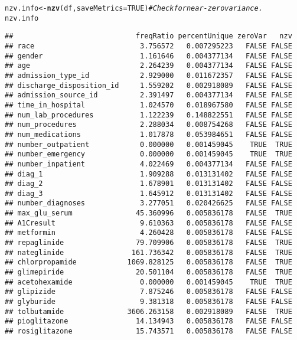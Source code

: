 \documentclass{article}\usepackage[]{graphicx}\usepackage[]{color}
\makeatletter
\newcommand{\hlnum}[1]{\textcolor[rgb]{0.686,0.059,0.569}{#1}}%
\newcommand{\hlcom}[1]{\textcolor[rgb]{0.678,0.584,0.686}{\textit{#1}}}%
\newcommand{\hlstd}[1]{\textcolor[rgb]{0.345,0.345,0.345}{#1}}%
\newcommand{\hlkwb}[1]{\textcolor[rgb]{0.69,0.353,0.396}{#1}}%
\newcommand{\hlkwc}[1]{\textcolor[rgb]{0.333,0.667,0.333}{#1}}%
\newcommand{\hlkwd}[1]{\textcolor[rgb]{0.737,0.353,0.396}{\textbf{#1}}}%
\newenvironment{kframe}{%
 \def\at@end@of@kframe{}%
 \ifinner\ifhmode%
  \def\at@end@of@kframe{\end{minipage}}%
  \begin{minipage}{\columnwidth}%
 \fi\fi%
 \def\FrameCommand##1{\hskip\@totalleftmargin \hskip-\fboxsep
 \colorbox{shadecolor}{##1}\hskip-\fboxsep
     \hskip-\linewidth \hskip-\@totalleftmargin \hskip\columnwidth}%
 \MakeFramed {\advance\hsize-\width
   \@totalleftmargin\z@ \linewidth\hsize
   \@setminipage}}%
 {\par\unskip\endMakeFramed%
 \at@end@of@kframe}
\newenvironment{knitrout}{}{} %
\makeatother
\begin{document}
\begin{knitrout}
\color{fgcolor}\begin{kframe}
\begin{alltt}
\hlstd{nzv.info} \hlkwb{<-} \hlkwd{nzv}\hlstd{(df,} \hlkwc{saveMetrics}\hlstd{=}\hlnum{TRUE}\hlstd{)}  \hlcom{# Check for near-zero variance.}
\hlstd{nzv.info}
\end{alltt}
\begin{verbatim}
##                             freqRatio percentUnique zeroVar   nzv
## race                         3.756572   0.007295223   FALSE FALSE
## gender                       1.161646   0.004377134   FALSE FALSE
## age                          2.264239   0.004377134   FALSE FALSE
## admission_type_id            2.929000   0.011672357   FALSE FALSE
## discharge_disposition_id     1.559202   0.002918089   FALSE FALSE
## admission_source_id          2.391497   0.004377134   FALSE FALSE
## time_in_hospital             1.024570   0.018967580   FALSE FALSE
## num_lab_procedures           1.122239   0.148822551   FALSE FALSE
## num_procedures               2.288034   0.008754268   FALSE FALSE
## num_medications              1.017878   0.053984651   FALSE FALSE
## number_outpatient            0.000000   0.001459045    TRUE  TRUE
## number_emergency             0.000000   0.001459045    TRUE  TRUE
## number_inpatient             4.022469   0.004377134   FALSE FALSE
## diag_1                       1.909288   0.013131402   FALSE FALSE
## diag_2                       1.678901   0.013131402   FALSE FALSE
## diag_3                       1.645912   0.013131402   FALSE FALSE
## number_diagnoses             3.277051   0.020426625   FALSE FALSE
## max_glu_serum               45.360996   0.005836178   FALSE  TRUE
## A1Cresult                    9.610363   0.005836178   FALSE FALSE
## metformin                    4.260428   0.005836178   FALSE FALSE
## repaglinide                 79.709906   0.005836178   FALSE  TRUE
## nateglinide                161.736342   0.005836178   FALSE  TRUE
## chlorpropamide            1069.828125   0.005836178   FALSE  TRUE
## glimepiride                 20.501104   0.005836178   FALSE  TRUE
## acetohexamide                0.000000   0.001459045    TRUE  TRUE
## glipizide                    7.875246   0.005836178   FALSE FALSE
## glyburide                    9.381318   0.005836178   FALSE FALSE
## tolbutamide               3606.263158   0.002918089   FALSE  TRUE
## pioglitazone                14.134943   0.005836178   FALSE FALSE
## rosiglitazone               15.743571   0.005836178   FALSE FALSE

\end{verbatim}
\end{kframe}
\end{knitrout}
\end{document}

